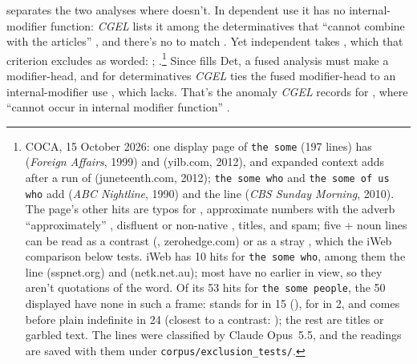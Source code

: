 \documentclass[12pt]{article}
\begin{document}
 separates the two analyses where  doesn't. In dependent use it has no internal-modifier function: \textit{CGEL} lists it among the determinatives that \enquote{cannot combine with the articles} \citep[539]{huddleston2002}, and there's no  to match . Yet independent  takes , which that criterion excludes as worded: ; .\footnote{COCA, 15 October 2026: one display page of \texttt{the some} (197 lines) has  (\textit{Foreign Affairs}, 1999) and  (yilb.com, 2012), and expanded context adds  after a run of  (juneteenth.com, 2012); \texttt{the some who} and \texttt{the some of us who} add  (\textit{ABC Nightline}, 1990) and the  line (\textit{CBS Sunday Morning}, 2010). The page's other hits are typos for , approximate numbers with the adverb  \enquote{approximately} \citep[385]{huddleston2002}, disfluent or non-native , titles, and spam; five  + noun lines can be read as a contrast (, zerohedge.com) or as a stray , which the iWeb comparison below tests. iWeb has 10 hits for \texttt{the some who}, among them the  line (sspnet.org) and  (netk.net.au); most have no earlier  in view, so they aren't quotations of the word. Of its 53 hits for \texttt{the some people}, the 50 displayed have none in such a frame:  stands for  in 15 (), for  in 2, and comes before plain indefinite  in 24 (closest to a contrast: ); the rest are titles or garbled text. The lines were classified by Claude Opus~5.5, and the readings are saved with them under \texttt{corpus/exclusion\_tests/}.} Since  fills Det, a fused analysis must make  a modifier-head, and for determinatives \textit{CGEL} ties the fused modifier-head to an internal-modifier use \citep[410, 415]{huddleston2002}, which  lacks. That's the anomaly \textit{CGEL} records for , where  \enquote{cannot occur in internal modifier function} \citep[377]{huddleston2002}.
\end{document}
